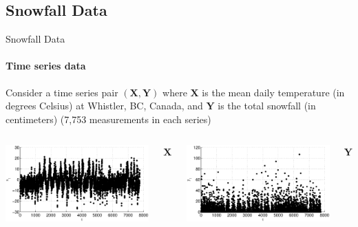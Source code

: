 \documentclass{beamer}
\begin{document}
\subsection{Snowfall Data}
\begin{frame}{Snowfall Data}
\framesubtitle{Time series data}
Consider a time series pair $(\mathbf{X},\mathbf{Y})$ where $\mathbf{X}$ is the mean daily temperature (in degrees Celsius) at Whistler, BC, Canada, and $\mathbf{Y}$ is the total snowfall (in centimeters) (7,753 measurements in each series)\footnotemark
{}
\begin{columns}[c]
	\includegraphics[scale=0.33]{WhistlerDailyExample_X.eps}\\
    \begin{center}$\mathbf{X}$\end{center}
	\includegraphics[scale=0.33]{WhistlerDailyExample_Y.eps}\\
    \begin{center}$\mathbf{Y}$\end{center}
\end{columns}
\pause
\begin{center}\end{center}
\end{frame}
\end{document}
